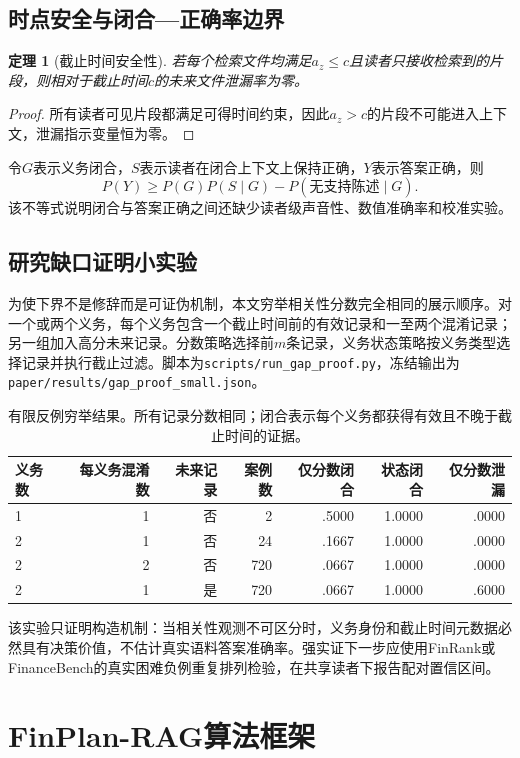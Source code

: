 \documentclass[12pt,openright]{ctexbook}
\newtheorem{theorem}{定理}[chapter]
\begin{document}
\section{时点安全与闭合—正确率边界}
\begin{theorem}[截止时间安全性]
若每个检索文件均满足$a_z\le c$且读者只接收检索到的片段，则相对于截止时间$c$的未来文件泄漏率为零。
\end{theorem}
\begin{proof}
所有读者可见片段都满足可得时间约束，因此$a_z>c$的片段不可能进入上下文，泄漏指示变量恒为零。
\end{proof}
令$G$表示义务闭合，$S$表示读者在闭合上下文上保持正确，$Y$表示答案正确，则
\[
 P(Y)\ge P(G)P(S\mid G)-P(\text{无支持陈述}\mid G).
\]
该不等式说明闭合与答案正确之间还缺少读者级声音性、数值准确率和校准实验。

\section{研究缺口证明小实验}
为使下界不是修辞而是可证伪机制，本文穷举相关性分数完全相同的展示顺序。对一个或两个义务，每个义务包含一个截止时间前的有效记录和一至两个混淆记录；另一组加入高分未来记录。分数策略选择前$m$条记录，义务状态策略按义务类型选择记录并执行截止过滤。脚本为\texttt{scripts/run\_gap\_proof.py}，冻结输出为\texttt{paper/results/gap\_proof\_small.json}。

\begin{table}[htbp]\centering\small
\caption{有限反例穷举结果。所有记录分数相同；闭合表示每个义务都获得有效且不晚于截止时间的证据。}
\begin{tabular}{lrrrrrr}\toprule
义务数&每义务混淆数&未来记录&案例数&仅分数闭合&状态闭合&仅分数泄漏\\\midrule
1&1&否&2&.5000&1.0000&.0000\\
2&1&否&24&.1667&1.0000&.0000\\
2&2&否&720&.0667&1.0000&.0000\\
2&1&是&720&.0667&1.0000&.6000\\\bottomrule
\end{tabular}
\end{table}

该实验只证明构造机制：当相关性观测不可区分时，义务身份和截止时间元数据必然具有决策价值，不估计真实语料答案准确率。强实证下一步应使用FinRank或FinanceBench的真实困难负例重复排列检验，在共享读者下报告配对置信区间。

\chapter{FinPlan-RAG算法框架}
\end{document}
